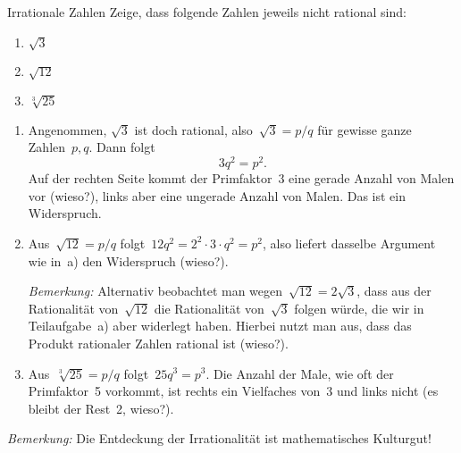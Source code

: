 \documentclass{algblatt}
\begin{document}

\begin{aufgabe}{Irrationale Zahlen}
Zeige, dass folgende Zahlen jeweils nicht rational sind:
\begin{enumerate}
\item $\sqrt{3}$
\item $\sqrt{12}$
\item $\sqrt[3]{25}$
\end{enumerate}
\begin{loesung}\begin{enumerate}
\item Angenommen, $\sqrt{3}$ ist doch rational, also~$\sqrt{3} = p/q$ für
gewisse ganze Zahlen~$p,q$. Dann folgt
\[ 3 q^2 = p^2. \]
Auf der rechten Seite kommt der Primfaktor~3 eine gerade Anzahl von Malen vor
(wieso?), links aber eine ungerade Anzahl von Malen. Das ist ein Widerspruch.
\item Aus~$\sqrt{12} = p/q$ folgt~$12 q^2 = 2^2 \cdot 3 \cdot q^2 = p^2$, also
liefert dasselbe Argument wie in~a) den Widerspruch (wieso?).

\emph{Bemerkung:} Alternativ beobachtet man wegen~$\sqrt{12} = 2 \sqrt{3}$,
dass aus der Rationalität von~$\sqrt{12}$ die Rationalität von~$\sqrt{3}$
folgen würde, die wir in Teilaufgabe~a) aber widerlegt haben. Hierbei nutzt man
aus, dass das Produkt rationaler Zahlen rational ist (wieso?).

\item Aus~$\sqrt[3]{25} = p/q$ folgt~$25 q^3 = p^3$. Die Anzahl der Male, wie
oft der Primfaktor~5 vorkommt, ist rechts ein Vielfaches von~3 und links nicht
(es bleibt der Rest~2, wieso?).
\end{enumerate}

\emph{Bemerkung:} Die Entdeckung der Irrationalität ist mathematisches
Kulturgut!
\end{loesung}
\end{aufgabe}
\end{document}

